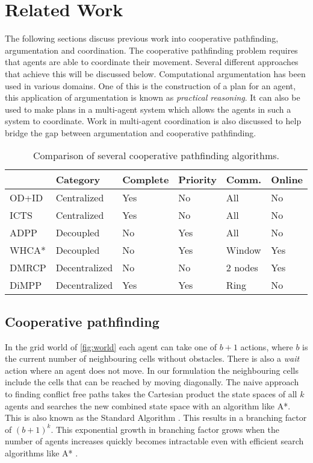 \section{Related Work}\label{sec:related}
The following sections discuss previous work into cooperative pathfinding,
argumentation and coordination. The cooperative pathfinding problem requires
that agents are able to coordinate their movement. Several different approaches
that achieve this will be discussed below. Computational argumentation has been
used in various domains. One of this is the construction of a plan for an agent,
this application of argumentation is known as \emph{practical reasoning}. It 
can also be used to make plans in a multi-agent system which allows the agents 
in such a system to coordinate. Work in multi-agent coordination is also 
discussed to help bridge the gap between argumentation and cooperative 
pathfinding.

\begin{table*}[h]
    \centering
    \caption{Comparison of several cooperative pathfinding algorithms.}
    \label{tbl:planning-overview}
    \begin{tabular}{l|l|l|l|l|l}
        & Category & Complete & Priority & Comm. & Online \\
        \hline
        OD+ID \citep{standley2010,standley2011} & Centralized & Yes & No & All &
        No \\
        ICTS \citep{sharon2013} & Centralized & Yes & No & All & No \\
        ADPP \citep{cap2012} & Decoupled & No & Yes & All & No \\
        WHCA* \citep{silver2005} & Decoupled & No & Yes & Window
        & Yes \\
		DMRCP \citep{wei2016} & Decentralized & No & No & 2 nodes & Yes \\
        DiMPP \citep{chouhan2017} & Decentralized & Yes & Yes & Ring & No \\
    \end{tabular}
\end{table*}

\subsection{Cooperative pathfinding}
In the grid world of \autoref{fig:world} each agent can take one of $b+1$
actions, where $b$ is the current number of neighbouring cells without
obstacles. There is also a \textit{wait} action where an agent does not move. 
In our formulation the neighbouring cells include the cells that can be reached
by moving diagonally. The naive approach to finding conflict free paths takes
the Cartesian product the state spaces of all $k$ agents and searches the new
combined state space with an algorithm like A*. This is also known as the
Standard Algorithm \citep{standley2010}. This results in a branching factor of
$(b+1)^k$. This exponential growth in branching factor grows when the number of 
agents increases quickly becomes intractable even with efficient search 
algorithms like A* \citep{sharon2013}.

